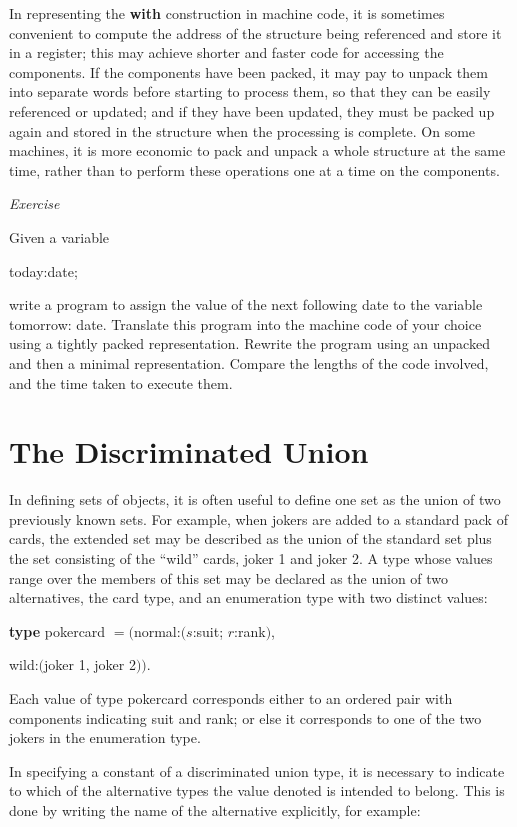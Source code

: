 In representing the \textbf{with} construction in machine code, it is sometimes convenient to compute the address of the structure being referenced and store it in a register; this may achieve shorter and faster code for accessing the components. If the components have been packed, it may pay to unpack them into separate words before starting to process them, so that they can be easily referenced or updated; and if they have been updated, they must be packed up again and stored in the structure when the processing is complete. On some machines, it is more economic to pack and unpack a whole structure at the same time, rather than to perform these operations one at a time on the components.

\noindent
\textit{Exercise}
\nopagebreak

\noindent
Given a variable

\quad today:date;

\noindent
write a program to assign the value of the next following date to the variable tomorrow: date. Translate this program into the machine code of your choice using a tightly packed representation. Rewrite the program using an unpacked and then a minimal representation. Compare the lengths of the code involved, and the time taken to execute them.

\section[The discriminated union]{The Discriminated Union}

In defining sets of objects, it is often useful to define one set as the union of two previously known sets. For example, when jokers are added to a standard pack of cards, the extended set may be described as the union of the standard set plus the set consisting of the ``wild'' cards, joker 1 and joker 2. A type whose values range over the members of this set may be declared as the union of two alternatives, the card type, and an enumeration type with two distinct values:

\quad \textbf{type} pokercard $= ($normal:$(s$:suit; $r$:rank$)$,

\tabto{10.2em}wild:$($joker 1, joker 2$))$.

\noindent
Each value of type pokercard corresponds either to an ordered pair with components indicating suit and rank; or else it corresponds to one of the two jokers in the enumeration type.

In specifying a constant of a discriminated union type, it is necessary to indicate to which of the alternative types the value denoted is intended to belong. This is done by writing the name of the alternative explicitly, for example:

